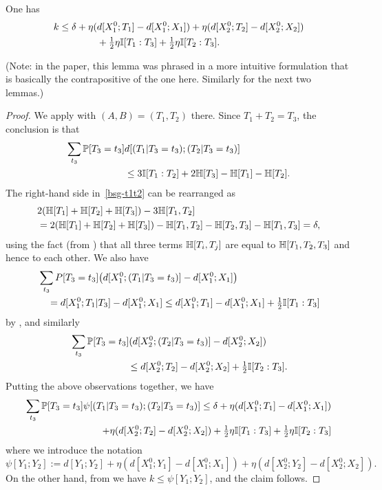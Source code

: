 \begin{lemma}\label{construct-good-prelim}
  \leanok
  One has
  \begin{align*}  k \leq
    \delta + \eta (& d[X^0_1;T_1]-d[X^0_1;X_1])
      + \eta (d[X^0_2;T_2]-d[X^0_2;X_2]) \\ & + \tfrac12 \eta \mathbb{I}[T_1:T_3] + \tfrac12 \eta \mathbb{I}[T_2:T_3].
  \end{align*}
\end{lemma}

(Note: in the paper, this lemma was phrased in a more intuitive formulation that is basically the contrapositive of the one here. Similarly for the next two lemmas.)

\begin{proof}\leanok
  We apply  with $(A,B) = (T_1, T_2)$ there.
  Since $T_1 + T_2 = T_3$, the conclusion is that
  \begin{align} \nonumber \sum_{t_3} \mathbb{P}[T_3 = t_3] & d[(T_1 | T_3 = t_3); (T_2 | T_3 = t_3)] \\ & \leq 3 \mathbb{I}[T_1 : T_2] + 2 \mathbb{H}[T_3] - \mathbb{H}[T_1] - \mathbb{H}[T_2].\label{bsg-t1t2}
  \end{align}
  The right-hand side in~\eqref{bsg-t1t2} can be rearranged as
  \begin{align*} & 2( \mathbb{H}[T_1] + \mathbb{H}[T_2] + \mathbb{H}[T_3]) - 3 \mathbb{H}[T_1,T_2] \\ & = 2(\mathbb{H}[T_1] + \mathbb{H}[T_2] + \mathbb{H}[T_3]) - \mathbb{H}[T_1,T_2] - \mathbb{H}[T_2,T_3] - \mathbb{H}[T_1, T_3] = \delta,\end{align*}
  using the fact (from ) that all three terms $\mathbb{H}[T_i,T_j]$ are equal to $\mathbb{H}[T_1,T_2,T_3]$ and hence to each other.
  We also have
  \begin{align*}
  &  \sum_{t_3} P[T_3 = t_3] \bigl(d[X^0_1; (T_1 | T_3=t_3)] - d[X^0_1;X_1]\bigr) \\
  &\quad = d[X^0_1; T_1 | T_3] - d[X^0_1;X_1] \leq d[X^0_1;T_1] - d[X^0_1;X_1] + \tfrac{1}{2} \mathbb{I}[T_1 : T_3]
  \end{align*}
  by , and similarly
  \begin{align*}
  &  \sum_{t_3} \mathbb{P}[T_3 = t_3] (d[X^0_2;(T_2 | T_3=t_3)] - d[X^0_2; X_2]) \\
  &\quad\quad\quad\quad\quad\quad \leq d[X^0_2;T_2] - d[X^0_2;X_2] + \tfrac{1}{2} \mathbb{I}[T_2 : T_3].
  \end{align*}
  Putting the above observations together, we have
  \begin{align*}
   \sum_{t_3} \mathbb{P}[T_3=t_3] \psi[(T_1 | T_3=t_3); (T_2 | T_3=t_3)] \leq \delta + \eta (d[X^0_1;T_1]-d[X^0_1;X_1]) \\
     + \eta (d[X^0_2;T_2]-d[X^0_2;X_2]) + \tfrac12 \eta \mathbb{I}[T_1:T_3] + \tfrac12 \eta \mathbb{I}[T_2:T_3]
   \end{align*}
where we introduce the notation
\[\psi[Y_1; Y_2] := d[Y_1;Y_2] +  \eta (d[X_1^0;Y_1] - d[X_1^0;X_1]) + \eta(d[X_2^0;Y_2] - d[X_2^0;X_2]).\]
On the other hand, from  we have $k \leq \psi[Y_1;Y_2]$, and the claim follows.
  \end{proof}


